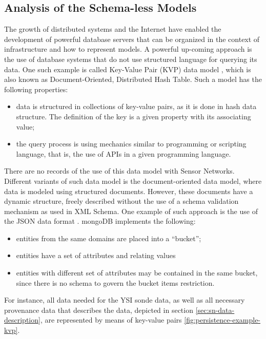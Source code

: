 \subsection{Analysis of the Schema-less Models}

The growth of distributed systems and the Internet have enabled the development
of powerful database servers that can be organized in the context of
infrastructure and how to represent models. A powerful up-coming approach is
the use of database systems that do not use structured language for querying
its data. One such example is called Key-Value Pair (KVP) data model
\cite{db-kvp}, which is also known as Document-Oriented, Distributed Hash
Table. Such a model has the following properties:

\begin{itemize}
  \item data is structured in collections of key-value pairs, as it is done in
  hash data structure. The definition of the key is a given property with its
  associating value;
  \item the query process is using mechanics similar to programming or
  scripting language, that is, the use of APIs in a given programming language.
\end{itemize}

There are no records of the use of this data model with Sensor Networks.
Different variants of such data model is the document-oriented data model,
where data is modeled using structured documents. However, these documents
have a dynamic structure, freely described without the use of a
schema validation mechanism as used in XML Schema. One example of such
approach is the use of the JSON data format \cite{json}. mongoDB implements the
following:

\begin{itemize}
  \item entities from the same domains are placed into a ``bucket'';
  \item entities have a set of attributes and relating values
  \item entities with different set of attributes may be contained in the same
  bucket, since there is no schema to govern the bucket items restriction.
\end{itemize}

For instance, all data needed for the YSI sonde data, as well as all necessary
provenance data that describes the data, depicted in section
\ref{sec:sn-data-description}, are represented by means of key-value pairs
\ref{fig:persistence-example-kvp}.


